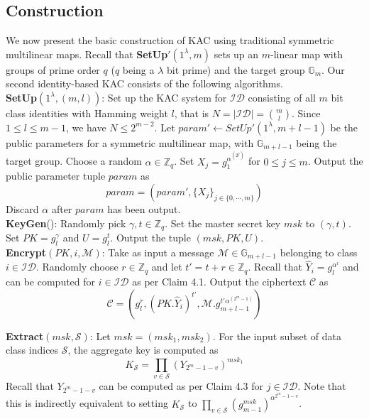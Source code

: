 \subsection{Construction}
\label{subsec:construction_2}

We now present the basic construction of KAC using traditional symmetric multilinear maps. Recall that \textbf{SetUp}$'(1^\lambda,m)$ sets up an $m$-linear map with groups of prime order $q$ ($q$ being a $\lambda$ bit prime) and the target group $\mathbb{G}_{m}$. Our second identity-based KAC consists of the following algorithms.\\

\noindent\textbf{SetUp}$(1^{\lambda},(m,l))$: Set up the KAC system for $\mathcal{ID}$ consisting of all $m$ bit class identities with Hamming weight $l$, that is $N=|\mathcal{ID}|=\binom{m}{l}$. Since $1\leq l\leq m-1$, we have $N\leq 2^{m-2}$. Let $param'\leftarrow SetUp'(1^{\lambda},m+l-1)$ be the public parameters for a symmetric multilinear map, with $\mathbb{G}_{m+l-1}$ being the target group. Choose a random $\alpha\in \mathbb{Z}_q$. Set $X_j=g^{\alpha^{(2^j)}}_{1}$ for $0\leq j\leq m$.  Output the public parameter tuple $param$ as
\begin{equation}
 param = (param',\{X_j\}_{j\in\{0,\cdots,m\}})\nonumber
\end{equation}
\noindent Discard $\alpha$ after $param$ has been output.\\

\noindent \textbf{KeyGen}(): Randomly pick $\gamma, t \in \mathbb{Z}_q$. Set the master secret key $msk$ to $(\gamma,t)$. Set $PK=g^{\gamma}_{l}$ and $U=g^{t}_{l}$. Output the tuple $(msk,PK,U)$.\\

\noindent \textbf{Encrypt}$(PK,i,\mathcal{M})$: Take as input a message $\mathcal{M} \in \mathbb{G}_{m+l-1}$ belonging to class $i \in \mathcal{ID}$. Randomly choose $r\in\mathbb{Z}_q$ and let $t'=t+r \in\mathbb{Z}_q$. Recall that $\hat{Y}_i=g^{\alpha^i}_{l}$ and can be computed for $i\in\mathcal{ID}$ as per Claim 4.1. Output the ciphertext $\mathcal{C}$ as 
\begin{equation}
 \mathcal{C}=(g^r_{l},(PK.\hat{Y}_i)^{t'},\mathcal{M}.g^{t'\alpha^{(2^m-1)}}_{m+l-1})\nonumber
\end{equation}

\noindent \textbf{Extract}$(msk,\mathcal{S})$: Let $msk=(msk_1,msk_2)$. For the input subset of data class indices $\mathcal{S}$, the aggregate key is computed as 
\begin{equation}
 K_{\mathcal{S}} = \prod_{v\in\mathcal{S}}\left({Y_{2^m-1-v}}\right)^{msk_1}\nonumber
\end{equation} 
\noindent Recall that $Y_{2^m-1-v}$ can be computed as per Claim 4.3 for $j\in\mathcal{ID}$. Note that this is indirectly equivalent to setting $K_{\mathcal{S}}$ to $\prod_{v\in\mathcal{S}}{\left(g^{msk}_{m-1}\right)}^{\alpha^{2^m-1-v}}$.\\
 
